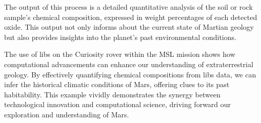 The output of this process is a detailed quantitative analysis of the soil or rock sample's chemical composition, expressed in weight percentages of each detected oxide. This output not only informs about the current state of Martian geology but also provides insights into the planet's past environmental conditions.

The use of \gls{libs} on the Curiosity rover within the MSL mission shows how computational advancements can enhance our understanding of extraterrestrial geology. By effectively quantifying chemical compositions from \gls{libs} data, we can infer the historical climatic conditions of Mars, offering clues to its past habitability. This example vividly demonstrates the synergy between technological innovation and computational science, driving forward our exploration and understanding of Mars.
